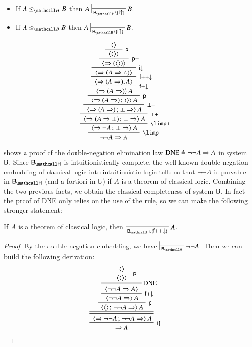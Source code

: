 \begin{corollary}
  ~\\\vspace{-1em}
  \begin{itemize}
    \item If $A \sementH B$ then $A \prov{\sysBH \setminus
    \{\rsf{i{\uparrow}}\}} B$.
    \item If $A \sementB B$ then $A \prov{\sysBB \setminus
    \{\rsf{i{\uparrow}}\}} B$.
  \end{itemize}
\end{corollary}


\begin{marginfigure}
  $$
  \R[{\limp}{-}]
  {\R[{\limp}{+}]
  {\R[{\bot}{+}]
  {\R[{\bot}{-}]
  {\R[\rsf{p}]
  {\R[\rsf{f{+}{\downarrow}}]
  {\R[\rsf{f{+}{+}{\downarrow}}]
  {\R[\rsf{i{\downarrow}}]
  {\R[\rsf{p}{+}]
  {\R[\rsf{p}]
  {{} \piq{}}
  {{} \piq{\piq{}}}}
  {{} \piq{\seq (\piq{})}}}
  {{} \piq{\seq (A \seq A)}}}
  {{} \piq{\seq (A \seq), A}}}
  {{} \piq{\seq (A \seq)} A}}
  {{} \piq{\seq (A \seq) \sep \piq{}} A}}
  {{} \piq{\seq (A \seq) \sep \bot \seq} A}}
  {{} \piq{\seq (A \seq \bot) \sep \bot \seq} A}}
  {{} \piq{\seq \neg A \sep \bot \seq} A}}
  {\neg \neg A \seq A}
  $$
  \caption{Proof of DNE in system $\sysB$}
\end{marginfigure}

 shows a proof of the double-negation elimination law
$\mathrm{DNE} \triangleq \neg \neg A \Rightarrow A$ in system $\sysB$. Since $\sysBH$ is
intuitionistically complete, the well-known double-negation embedding of
classical logic into intuitionistic logic tells us that $\neg \neg A$ is
provable in $\sysBH$ (and a fortiori in $\sysB$) if $A$ is a theorem of
classical logic. Combining the two previous facts, we obtain the classical
completeness of system $\sysB$. In fact the proof of DNE only relies on the use
of the  rule, so we can make the following stronger
statement:

\begin{corollary}\label{cor:bubbles-completeness-classical}
  If $A$ is a theorem of classical logic, then $\prov{\sysBH \cup
  \{\rsf{f{+}{+}{\downarrow}}\}} A$.
\end{corollary}
\begin{proof}
  By the double-negation embedding, we have $\prov{\sysBH} \neg \neg A$. Then we
  can build the following derivation:
  $$
  \R[\rsf{i{\uparrow}}]
  {\prftree[d]
  {\R[\rsf{p}]
  {\R[\rsf{f{+}{\downarrow}}]
  {\prftree[r][d]{DNE}  
  {\R[\rsf{p}]
  {{} \piq{}}
  {{} \piq{\piq{}}}}
  {{} \piq{\neg \neg A \seq A}}}
  {{} \piq{\neg \neg A \seq} A}}
  {{} \piq{\piq{} \sep \neg \neg A \seq} A}}
  {{} \piq{\seq \neg \neg A \sep \neg \neg A \seq} A}}
  {\seq A}
  $$
\end{proof}

